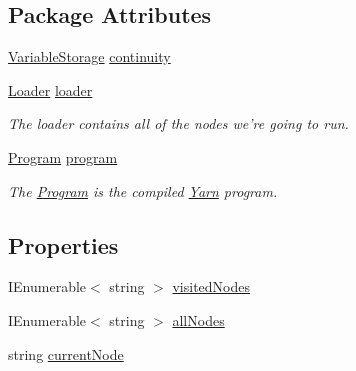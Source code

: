 \subsection*{Package Attributes}
\begin{DoxyCompactItemize}
\item 
\hyperlink{a00167}{Variable\-Storage} \hyperlink{a00088_ae94eaa4b03b432422f5d205fabe37ff5}{continuity}
\item 
\hyperlink{a00125}{Loader} \hyperlink{a00088_a98bbe0ac2ccadeeeb7e05e3e6e19f2e0}{loader}
\begin{DoxyCompactList}\small\item\em The loader contains all of the nodes we're going to run. \end{DoxyCompactList}\item 
\hyperlink{a00138}{Program} \hyperlink{a00088_a0a1cca92325f430425d784d416cb5c2b}{program}
\begin{DoxyCompactList}\small\item\em The \hyperlink{a00138}{Program} is the compiled \hyperlink{a00048}{Yarn} program. \end{DoxyCompactList}\end{DoxyCompactItemize}
\subsection*{Properties}
\begin{DoxyCompactItemize}
\item 
I\-Enumerable$<$ string $>$ \hyperlink{a00088_ac5661051e0b7f44527fe526c7766dbbf}{visited\-Nodes}
\item 
I\-Enumerable$<$ string $>$ \hyperlink{a00088_a0ee573e3d072bccf98ba1d975612d42c}{all\-Nodes}
\item 
string \hyperlink{a00088_af368b5c342d585dc6953876c5965ccc8}{current\-Node}
\end{DoxyCompactItemize}
